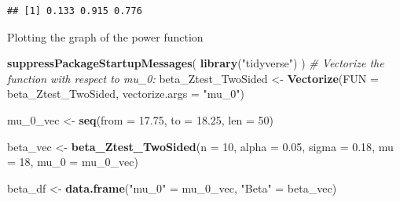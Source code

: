 \documentclass[]{book}
\newenvironment{Shaded}{\begin{snugshade}}{\end{snugshade}}
\newcommand{\CommentTok}[1]{\textcolor[rgb]{0.56,0.35,0.01}{\textit{#1}}}
\newcommand{\DataTypeTok}[1]{\textcolor[rgb]{0.13,0.29,0.53}{#1}}
\newcommand{\DecValTok}[1]{\textcolor[rgb]{0.00,0.00,0.81}{#1}}
\newcommand{\FloatTok}[1]{\textcolor[rgb]{0.00,0.00,0.81}{#1}}
\newcommand{\KeywordTok}[1]{\textcolor[rgb]{0.13,0.29,0.53}{\textbf{#1}}}
\newcommand{\NormalTok}[1]{#1}
\newcommand{\StringTok}[1]{\textcolor[rgb]{0.31,0.60,0.02}{#1}}
\theoremstyle{definition}
\theoremstyle{definition}
\theoremstyle{definition}
\theoremstyle{remark}
\begin{document}
\begin{verbatim}
## [1] 0.133 0.915 0.776
\end{verbatim}

Plotting the graph of the power function

\begin{Shaded}
\begin{Highlighting}[]
\KeywordTok{suppressPackageStartupMessages}\NormalTok{(}
  \KeywordTok{library}\NormalTok{(}\StringTok{"tidyverse"}\NormalTok{)}
\NormalTok{)}
\CommentTok{# Vectorize the function with respect to mu_0:}
\NormalTok{beta_Ztest_TwoSided <-}\StringTok{ }\KeywordTok{Vectorize}\NormalTok{(}\DataTypeTok{FUN =}\NormalTok{ beta_Ztest_TwoSided, }
                                 \DataTypeTok{vectorize.args =} \StringTok{"mu_0"}\NormalTok{)}

\NormalTok{mu_}\DecValTok{0}\NormalTok{_vec <-}\StringTok{ }\KeywordTok{seq}\NormalTok{(}\DataTypeTok{from =} \FloatTok{17.75}\NormalTok{, }\DataTypeTok{to =} \FloatTok{18.25}\NormalTok{, }\DataTypeTok{len =} \DecValTok{50}\NormalTok{)}

\NormalTok{beta_vec <-}\StringTok{ }\KeywordTok{beta_Ztest_TwoSided}\NormalTok{(}\DataTypeTok{n     =}   \DecValTok{10}\NormalTok{, }
                                \DataTypeTok{alpha =} \FloatTok{0.05}\NormalTok{, }
                                \DataTypeTok{sigma =} \FloatTok{0.18}\NormalTok{, }
                                \DataTypeTok{mu    =}  \DecValTok{18}\NormalTok{, }
                                \DataTypeTok{mu_0  =}\NormalTok{ mu_}\DecValTok{0}\NormalTok{_vec)}

\NormalTok{beta_df <-}\StringTok{ }\KeywordTok{data.frame}\NormalTok{(}\StringTok{"mu_0"}\NormalTok{  =}\StringTok{ }\NormalTok{mu_}\DecValTok{0}\NormalTok{_vec,}
                      \StringTok{"Beta"}\NormalTok{  =}\StringTok{ }\NormalTok{beta_vec)}


\end{Highlighting}
\end{Shaded}
\end{document}
